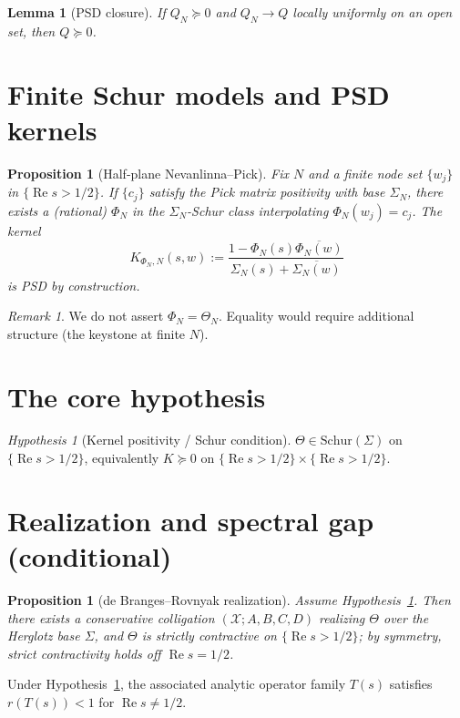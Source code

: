 \documentclass[11pt]{article}
\newcommand{\ReS}{\operatorname{Re}}
\newcommand{\Th}{\Theta}
\newcommand{\Si}{\Sigma}
\newcommand{\ThN}{\Theta_N}
\newcommand{\SiN}{\Sigma_N}
\newcommand{\Hhp}{\{\ReS s>1/2\}}
\theoremstyle{plain}
\newtheorem{proposition}[theorem]{Proposition}
\newtheorem{lemma}[theorem]{Lemma}
\theoremstyle{definition}
\theoremstyle{remark}
\newtheorem{remark}[theorem]{Remark}
\newtheorem{hypothesis}[theorem]{Hypothesis}
\begin{document}
\begin{lemma}[PSD closure]
If $Q_N\succeq 0$ and $Q_N\to Q$ locally uniformly on an open set, then $Q\succeq 0$.
\end{lemma}

\section{Finite Schur models and PSD kernels}
\begin{proposition}[Half-plane Nevanlinna--Pick]
Fix $N$ and a finite node set $\{w_j\}$ in $\Hhp$. If $\{c_j\}$ satisfy the Pick matrix positivity with base $\SiN$, there exists a (rational) $\Phi_N$ in the $\SiN$-Schur class interpolating $\Phi_N(w_j)=c_j$. The kernel
\[
K_{\Phi_N,N}(s,w):=\frac{1-\Phi_N(s)\overline{\Phi_N(w)}}{\SiN(s)+\overline{\SiN(w)}}
\]
is PSD by construction.
\end{proposition}

\begin{remark}
We do not assert $\Phi_N=\ThN$. Equality would require additional structure (the keystone at finite $N$).
\end{remark}

\section{The core hypothesis}
\begin{hypothesis}[Kernel positivity / Schur condition]\label{hyp:core}
$\Th\in\mathrm{Schur}(\Si)$ on $\Hhp$, equivalently $K\succeq 0$ on $\Hhp\times\Hhp$.
\end{hypothesis}

\section{Realization and spectral gap (conditional)}
\begin{proposition}[de Branges--Rovnyak realization]
Assume Hypothesis~\ref{hyp:core}. Then there exists a conservative colligation $(\mathcal{X};A,B,C,D)$ realizing $\Th$ over the Herglotz base $\Si$, and $\Th$ is strictly contractive on $\Hhp$; by symmetry, strict contractivity holds off $\ReS s=1/2$.
\end{proposition}

\begin{corollary}
Under Hypothesis~\ref{hyp:core}, the associated analytic operator family $T(s)$ satisfies $r(T(s))<1$ for $\ReS s\ne 1/2$.
\end{corollary}
\end{document}
